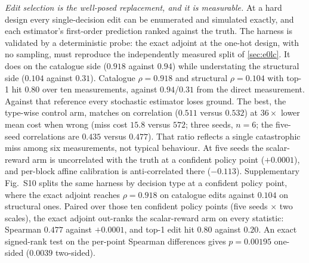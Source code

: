 \documentclass[journal]{IEEEtran}
\begin{document}
\emph{Edit selection is the well-posed replacement, and it is measurable.}  At a
hard design every single-decision edit can be enumerated and simulated exactly,
and each estimator's first-order prediction ranked against the truth.  The
harness is validated by a deterministic probe: the exact adjoint at the one-hot
design, with no sampling, must reproduce the independently measured split of
\cref{sec:e0lc}.  It does on the catalogue side ($0.918$ against $0.94$) while
understating the structural side ($0.104$ against $0.31$).  Catalogue $\rho=0.918$ and structural
$\rho=0.104$ with top-1 hit $0.80$ over ten measurements, against $0.94$/$0.31$
from the direct measurement.  Against that reference every stochastic estimator
loses ground.  The best, the type-wise control arm, matches on correlation
($0.511$ versus $0.532$) at $36\times$ lower mean cost when wrong (miss cost
$15.8$ versus $572$; three seeds, $n=6$; the five-seed correlations are $0.435$
versus $0.477$).  That ratio reflects a single catastrophic miss among six
measurements, not typical behaviour.  At five seeds the scalar-reward arm is uncorrelated with the
truth at a confident policy point ($+0.0001$), and per-block affine calibration
is anti-correlated there ($-0.113$).  Supplementary Fig.~S10 splits the same
harness by decision type at a confident policy point, where the exact adjoint
reaches $\rho=0.918$ on catalogue edits against $0.104$ on structural ones.
Paired over those ten confident policy points (five seeds $\times$ two scales),
the exact adjoint out-ranks the scalar-reward arm on every statistic: Spearman
$0.477$ against $+0.0001$, and top-1 edit hit $0.80$ against $0.20$.  An exact
signed-rank test on the per-point Spearman differences gives $p=0.00195$ one-sided
($0.0039$ two-sided).
\end{document}
